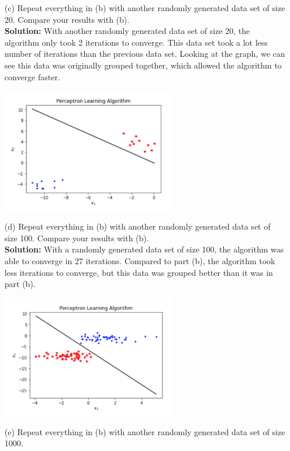 \documentclass[a4paper]{article}
\begin{document}
\begin{itemize}
\begin{center}
    \end{center}
    \item[(c)] Repeat everything in (b) with another randomly generated data set of size 20.  
    Compare your results with (b).\\
    \textbf{Solution:} With another randomly generated data set of size 20, the algorithm only 
    took 2 iterations to converge.  This data set took a lot less number of iterations than the 
    previous data set.  Looking at the graph, we can see this data was originally grouped together, 
    which allowed the algorithm to converge faster.
    \begin{center}
        \includegraphics[width=0.6\textwidth]{1-4-c.jpg}
    \end{center}
    \item[(d)] Repeat everything in (b) with another randomly generated data set of size 100.  
    Compare your results with (b).\\
    \textbf{Solution:} With a randomly generated data set of size 100, the algorithm was able to 
    converge in 27 iterations.  Compared to part (b), the algorithm took less iterations to converge, 
    but this data was grouped better than it was in part (b).
    \begin{center}
        \includegraphics[width=0.6\textwidth]{1-4-d.jpg}
    \end{center}
    \item[(e)] Repeat everything in (b) with another randomly generated data set of size 1000.  

\end{itemize}
\end{document}
